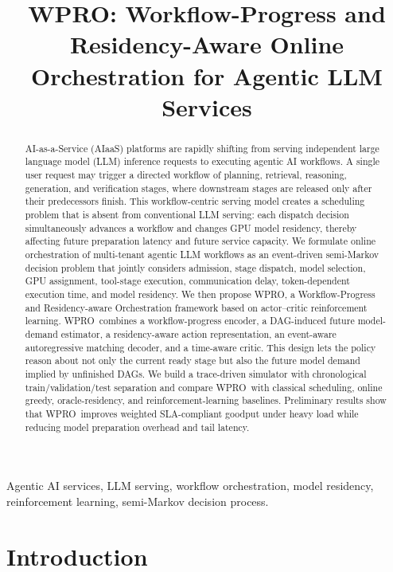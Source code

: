 \documentclass[10pt,conference]{IEEEtran}
\title{WPRO: Workflow-Progress and Residency-Aware Online Orchestration for Agentic LLM Services}
\author{
\IEEEauthorblockN{Anonymous Authors}
\IEEEauthorblockA{Paper draft prepared for internal research discussion}
}
\newcommand{\WPRO}{\textsc{WPRO}}
\begin{document}
\maketitle

\begin{abstract}
AI-as-a-Service (AIaaS) platforms are rapidly shifting from serving independent large language model (LLM) inference requests to executing agentic AI workflows. A single user request may trigger a directed workflow of planning, retrieval, reasoning, generation, and verification stages, where downstream stages are released only after their predecessors finish. This workflow-centric serving model creates a scheduling problem that is absent from conventional LLM serving: each dispatch decision simultaneously advances a workflow and changes GPU model residency, thereby affecting future preparation latency and future service capacity. We formulate online orchestration of multi-tenant agentic LLM workflows as an event-driven semi-Markov decision problem that jointly considers admission, stage dispatch, model selection, GPU assignment, tool-stage execution, communication delay, token-dependent execution time, and model residency. We then propose \WPRO, a Workflow-Progress and Residency-aware Orchestration framework based on actor--critic reinforcement learning. \WPRO\ combines a workflow-progress encoder, a DAG-induced future model-demand estimator, a residency-aware action representation, an event-aware autoregressive matching decoder, and a time-aware critic. This design lets the policy reason about not only the current ready stage but also the future model demand implied by unfinished DAGs. We build a trace-driven simulator with chronological train/validation/test separation and compare \WPRO\ with classical scheduling, online greedy, oracle-residency, and reinforcement-learning baselines. Preliminary results show that \WPRO\ improves weighted SLA-compliant goodput under heavy load while reducing model preparation overhead and tail latency.
\end{abstract}

\begin{IEEEkeywords}
Agentic AI services, LLM serving, workflow orchestration, model residency, reinforcement learning, semi-Markov decision process.
\end{IEEEkeywords}

\section{Introduction}
\end{document}
